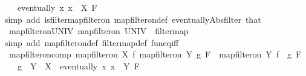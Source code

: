 \begin{isabellebody}
\ \ \ {\isachardoublequoteopen}eventually\ {\isacharparenleft}{\kern0pt}{\isasymlambda}x{\isachardot}{\kern0pt}\ x\ {\isasymin}\ X{\isacharparenright}{\kern0pt}\ F{\isachardoublequoteclose}\isanewline
%
\isadelimproof
\ \ %
\endisadelimproof
%
\isatagproof
{}\isamarkupfalse%
{\isacharparenleft}{\kern0pt}simp\ add{\isacharcolon}{\kern0pt}\ is{\isacharunderscore}{\kern0pt}filter{\isacharunderscore}{\kern0pt}map{\isacharunderscore}{\kern0pt}filter{\isacharunderscore}{\kern0pt}on\ map{\isacharunderscore}{\kern0pt}filter{\isacharunderscore}{\kern0pt}on{\isacharunderscore}{\kern0pt}def\ eventually{\isacharunderscore}{\kern0pt}Abs{\isacharunderscore}{\kern0pt}filter\ that{\isacharparenright}{\kern0pt}%
\endisatagproof
{\isafoldproof}%
%
\isadelimproof
\isanewline
%
\endisadelimproof
\isanewline
{}\isamarkupfalse%
\ map{\isacharunderscore}{\kern0pt}filter{\isacharunderscore}{\kern0pt}on{\isacharunderscore}{\kern0pt}UNIV{\isacharcolon}{\kern0pt}\ {\isachardoublequoteopen}map{\isacharunderscore}{\kern0pt}filter{\isacharunderscore}{\kern0pt}on\ UNIV\ {\isacharequal}{\kern0pt}\ filtermap{\isachardoublequoteclose}\isanewline
%
\isadelimproof
\ \ %
\endisadelimproof
%
\isatagproof
{}\isamarkupfalse%
{\isacharparenleft}{\kern0pt}simp\ add{\isacharcolon}{\kern0pt}\ map{\isacharunderscore}{\kern0pt}filter{\isacharunderscore}{\kern0pt}on{\isacharunderscore}{\kern0pt}def\ filtermap{\isacharunderscore}{\kern0pt}def\ fun{\isacharunderscore}{\kern0pt}eq{\isacharunderscore}{\kern0pt}iff{\isacharparenright}{\kern0pt}%
\endisatagproof
{\isafoldproof}%
%
\isadelimproof
\isanewline
%
\endisadelimproof
\isanewline
{}\isamarkupfalse%
\ map{\isacharunderscore}{\kern0pt}filter{\isacharunderscore}{\kern0pt}on{\isacharunderscore}{\kern0pt}comp{\isacharcolon}{\kern0pt}\ {\isachardoublequoteopen}map{\isacharunderscore}{\kern0pt}filter{\isacharunderscore}{\kern0pt}on\ X\ f\ {\isacharparenleft}{\kern0pt}map{\isacharunderscore}{\kern0pt}filter{\isacharunderscore}{\kern0pt}on\ Y\ g\ F{\isacharparenright}{\kern0pt}\ {\isacharequal}{\kern0pt}\ map{\isacharunderscore}{\kern0pt}filter{\isacharunderscore}{\kern0pt}on\ Y\ {\isacharparenleft}{\kern0pt}f\ {\isasymcirc}\ g{\isacharparenright}{\kern0pt}\ F{\isachardoublequoteclose}\isanewline
\ \ \ {\isachardoublequoteopen}g\ {\isacharbackquote}{\kern0pt}\ Y\ {\isasymsubseteq}\ X{\isachardoublequoteclose}\ \ {\isachardoublequoteopen}eventually\ {\isacharparenleft}{\kern0pt}{\isasymlambda}x{\isachardot}{\kern0pt}\ x\ {\isasymin}\ Y{\isacharparenright}{\kern0pt}\ F{\isachardoublequoteclose}\isanewline

\end{isabellebody}
